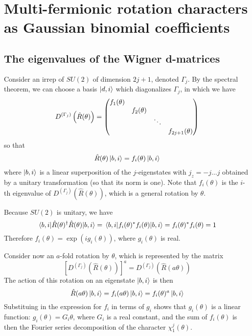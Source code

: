 \documentclass[12pt]{article}
\begin{document}
	\section{Multi-fermionic rotation characters as Gaussian binomial coefficients}
	\subsection{The eigenvalues of the Wigner d-matrices}
	Consider an irrep of $SU(2)$ of dimension $2j+1$, denoted $\Gamma_j$. By the spectral theorem, we can choose a basis $\ket{d, i}$ which diagonalizes $\Gamma_j$, in which we have
	\begin{equation}
	D^{(\Gamma_j)}\left(\hat{R}(\theta)\right)=\mqty(\dmat{f_1(\theta),f_2(\theta),\ddots,f_{2j+1}(\theta)})
	\end{equation}
	so that
	\begin{eqnarray}
	\hat{R}(\theta)\ket{b,i}=f_i(\theta)\ket{b, i}
	\end{eqnarray}
	where $\ket{b,i}$ is a linear superposition of the $j$-eigenstates with $j_z=-j\dots j$ obtained by a unitary transformation (so that its norm is one). Note that $f_i(\theta)$ is the $i$-th eigenvalue of $D^{(\Gamma_j)}\left(\hat{R}(\theta)\right)$, which is a general rotation by $\theta$.
	
	Because $SU(2)$ is unitary, we have
	\begin{equation}
	\mel{b,i}{\hat{R}(\theta)^\dagger \hat{R}(\theta)}{b,i}=\mel{b,i}{f_i(\theta)^*f_i(\theta)}{b,i}=f_i(\theta)^*f_i(\theta)=1
	\end{equation}
	Therefore $f_i(\theta)=\exp(ig_i(\theta))$, where $g_i(\theta)$ is real.
	
	Consider now an $a$-fold rotation by $\theta$, which is represented by the matrix
	$$\left[D^{(\Gamma_j)}\left(\hat{R}(\theta)\right)\right]^a=D^{(\Gamma_j)}\left(\hat{R}(a\theta)\right)$$
	The action of this rotation on an eigenstate $\ket{b,i}$ is then
	\begin{equation}
	\hat{R}(a\theta)\ket{b,i} = f_i(a\theta)\ket{b,i} = f_i(\theta)^a\ket{b,i}
	\end{equation}
	Substituing in the expression for $f_i$ in terms of $g_i$ shows that $g_i(\theta)$ is a linear function: $g_i(\theta) = G_i\theta$, where $G_i$ is a real constant, and the sum of $f_i(\theta)$ is then the Fourier series decomposition of the character $\chi^j_1(\theta)$.
	
\end{document}
